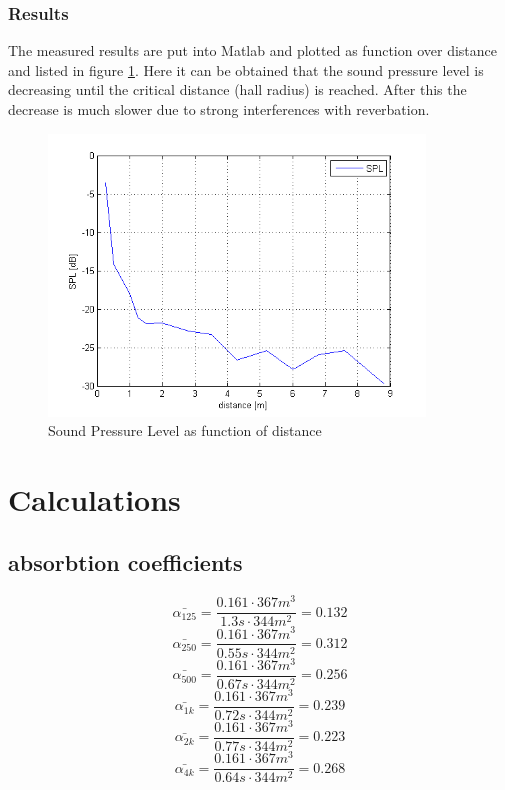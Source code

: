 \documentclass{article}
\begin{document}
\subsubsection{Results}
The measured results are put into Matlab and plotted as function over distance and listed in figure \ref{fig:spl}. Here it can be obtained that the sound pressure level is decreasing until the critical distance (hall radius) is reached. After this the decrease is much slower due to strong interferences with reverbation.
\begin{figure}[htbp]
\begin{center}
\includegraphics[width=10cm,keepaspectratio=true]{SPL}
\caption{Sound Pressure Level as function of distance}
\label{fig:spl}
\end{center}
\end{figure}

\newpage
\section{Calculations}
\subsection{absorbtion coefficients}
$$\bar{\alpha_{125}}=\frac{0.161\cdot 367m^3}{1.3s\cdot 344m^2}=0.132$$
$$\bar{\alpha_{250}}=\frac{0.161\cdot 367m^3}{0.55s\cdot 344m^2}=0.312$$
$$\bar{\alpha_{500}}=\frac{0.161\cdot 367m^3}{0.67s\cdot 344m^2}=0.256$$
$$\bar{\alpha_{1k}}=\frac{0.161\cdot 367m^3}{0.72s\cdot 344m^2}=0.239$$
$$\bar{\alpha_{2k}}=\frac{0.161\cdot 367m^3}{0.77s\cdot 344m^2}=0.223$$
$$\bar{\alpha_{4k}}=\frac{0.161\cdot 367m^3}{0.64s\cdot 344m^2}=0.268$$
\end{document}

